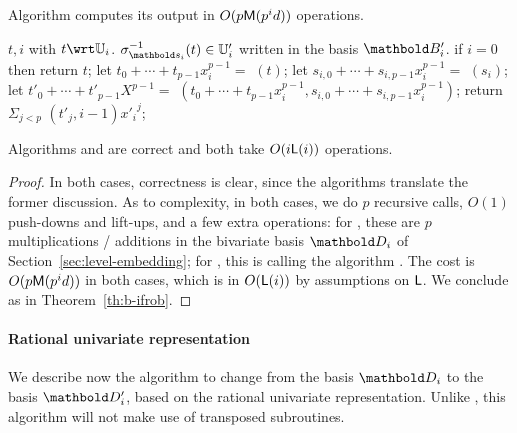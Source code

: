 \begin{lemma}
  \label{th:rur-s}
  Algorithm  computes its output in
  $O(p\mathsf{M}(p^id))$ operations.
\end{lemma}

\begin{algorithm}
  \caption{} 
  \label{alg:applyinverse}
  \begin{algorithmic}[1]
    \REQUIRE $t,i$ with $t \wrt \U_i$.
    \ENSURE $\sigma_{\lst{s}_i}^{-1}(t)\in \U'_i$ written in the basis $\basis{B}'_i$.
    \STATE if $i=0$ then return $t$;
    \STATE let $t_0 + \cdots + t_{p-1}x_i^{p-1} =$ $(t)$;
    \STATE let $s_{i,0}+\cdots+s_{i,p-1}x_i^{p-1}=$ $(s_i)$;
    \STATE let $t'_0 + \cdots + t'_{p-1}X^{p-1} =$ $(t_0 + \cdots + t_{p-1}x_i^{p-1}, s_{i,0}+\cdots+s_{i,p-1}x_i^{p-1})$;
  \STATE return $\Sigma_{j < p}$ $(t'_j, i-1) {x'_i}^j$;
\end{algorithmic}
\end{algorithm}

\begin{proposition}\label{Prop:apply}
  Algorithms  and
   are correct and both take $O(i\mathsf{L}(i))$
  operations.
\end{proposition}
\begin{proof}
  In both cases, correctness is clear, since the algorithms translate
  the former discussion. As to complexity, in both cases, we do $p$
  recursive calls, $O(1)$ push-downs and lift-ups, and a few extra
  operations: for , these are $p$
  multiplications / additions in the bivariate basis $\basis{D}_i$ of
  Section~\ref{sec:level-embedding}; for , this is
  calling the algorithm
  .  The cost is
  $O(p\mathsf{M}(p^id))$ in both cases, which is in $O(\mathsf{L}(i))$ by
  assumptions on $\mathsf{L}$. We conclude as in Theorem~\ref{th:b-ifrob}.
\end{proof}


\paragraph{Rational univariate representation}
We describe now the algorithm to change from the basis $\basis{D}_i$
to the basis $\basis{D}_i'$, based on the rational univariate
representation. Unlike , this algorithm will not make use
of transposed subroutines.

